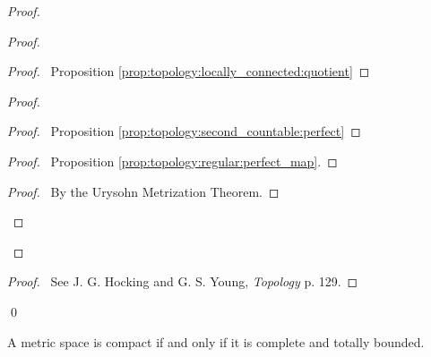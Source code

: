 \begin{proof}
\begin{proof}
  \begin{proof}
    \pf\ Proposition \ref{prop:topology:locally_connected:quotient}
  \end{proof}
  \begin{proof}
    \begin{proof}
      \pf\ Proposition \ref{prop:topology:second_countable:perfect}
    \end{proof}
    \begin{proof}
      \pf\ Proposition \ref{prop:topology:regular:perfect_map}.
    \end{proof}
    \qedstep
    \begin{proof}
      \pf\ By the Urysohn Metrization Theorem.
    \end{proof}
  \end{proof}
\end{proof}
  \begin{proof}
    \pf\ See J. G. Hocking and G. S. Young, \emph{Topology} p. 129.
  \end{proof}
  \qed
\end{proof}

\begin{thm}[DC]
  \label{metric:compact_complete_totally_bounded}
  A metric space is compact if and only if it is complete and totally bounded.
\end{thm}

